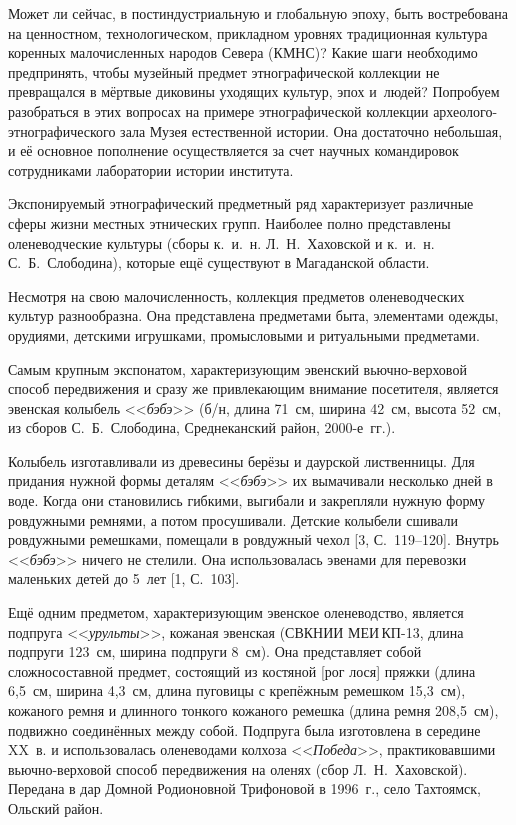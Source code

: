  

\makeProcTitle
{}

Может ли сейчас, в постиндустриальную и глобальную эпоху, быть востребована на ценностном, технологическом, прикладном уровнях традиционная культура коренных малочисленных народов Севера (КМНС)? Какие шаги необходимо предпринять, чтобы музейный предмет этнографической коллекции не превращался в мёртвые диковины уходящих культур, эпох и~людей? Попробуем разобраться в этих вопросах на примере этнографической коллекции археолого-этнографического зала Музея естественной истории. Она достаточно небольшая, и её основное пополнение осуществляется за счет научных командировок сотрудниками лаборатории истории института.

Экспонируемый этнографический предметный ряд характеризует различные сферы жизни местных этнических групп. Наиболее полно представлены оленеводческие культуры (сборы к.~и.~н. Л.~Н.~Хаховской и к.~и.~н. С.~Б.~Слободина), которые ещё существуют в Магаданской области.

Несмотря на свою малочисленность, коллекция предметов оленеводческих культур разнообразна. Она представлена предметами быта, элементами одежды, орудиями, детскими игрушками, промысловыми и ритуальными предметами.

Самым крупным экспонатом, характеризующим эвенский вьючно-вер\-хо\-вой способ передвижения и сразу же привлекающим внимание посетителя, является эвенская колыбель <<\textit{бэбэ}>> (б/н, длина 71~см, ширина 42~см, высота 52~см, из сборов С.~Б.~Слободина, Среднеканский район, 2000-е~гг.).

Колыбель изготавливали из древесины берёзы и даурской лиственницы. Для придания нужной формы деталям <<\textit{бэбэ}>> их вымачивали несколько дней в воде. Когда они становились гибкими, выгибали и закрепляли нужную форму ровдужными ремнями, а потом просушивали. Детские колыбели сшивали ровдужными ремешками, помещали в ровдужный чехол [3, С.~119--120]. Внутрь <<\textit{бэбэ}>> ничего не стелили. Она использовалась эвенами для перевозки маленьких детей до 5~лет [1, С.~103].

Ещё одним предметом, характеризующим эвенское оленеводство, является подпруга <<\textit{урульты}>>, кожаная эвенская (СВКНИИ МЕИ\,КП-13, длина подпруги 123~см, ширина подпруги 8~см). Она представляет собой сложносоставной предмет, состоящий из костяной [рог лося] пряжки (длина 6,5~см, ширина 4,3~см, длина пуговицы с крепёжным ремешком 15,3~см), кожаного ремня и длинного тонкого кожаного ремешка (длина ремня 208,5~см), подвижно соединённых между собой. Подпруга была изготовлена в середине XX~в. и использовалась оленеводами колхоза <<\textit{Победа}>>, практиковавшими вьючно-верховой способ передвижения на оленях (сбор Л.~Н.~Хаховской). Передана в дар Домной Родионовной Трифоновой в 1996~г., село Тахтоямск, Ольский район.

